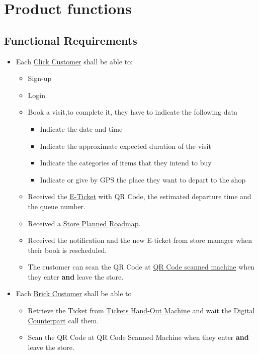\documentclass[a4paper,12pt]{book}
\begin{document}
\section{Product functions}
\subsection{Functional Requirements}
\begin{itemize}
	\item Each \hyperref[Definitions]{Click Customer} shall be able to: 
	\begin{itemize}
		\item Sign-up 
		\item Login
		\item Book a visit,to complete it, they have to indicate the following data
		\begin{itemize}
			\item Indicate the date and time
			\item Indicate the approximate expected duration of the visit
			\item Indicate the categories of items that they intend to buy
			\item Indicate or give by GPS the place they want to depart to the shop
		\end{itemize}
		\item Received the \hyperref[Definitions]{E-Ticket} with QR Code, the estimated departure time and the queue number.
		\item Received a \hyperref[Definitions]{Store Planned Roadmap}.	
		\item Received the notification and the new E-ticket from store manager when their book is rescheduled.
		\item The customer can scan the QR Code at \hyperref[Definitions]{QR Code scanned machine} when they enter \textbf{and} leave the store.
	\end{itemize}

	\item Each \hyperref[Definitions]{Brick Customer} shall be able to
	\begin{itemize}
		\item Retrieve the \hyperref[Definitions]{Ticket} from \hyperref[Definitions]{Tickets Hand-Out Machine} and wait the \hyperref[Definitions]{Digital Counterpart} call them.
		\item Scan the QR Code at QR Code Scanned Machine when they enter \textbf{and} leave the store.
	\end{itemize}


\end{itemize}
\end{document}
